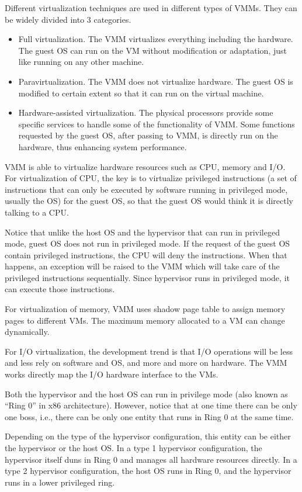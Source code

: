 Different virtualization techniques are used in different types of VMMs. They can be widely divided into 3 categories.
\begin{itemize}
	\item Full virtualization. The VMM virtualizes everything including the hardware. The guest OS can run on the VM without modification or adaptation, just like running on any other machine.
	\item Paravirtualization. The VMM does not virtualize hardware. The guest OS is modified to certain extent so that it can run on the virtual machine.
	\item Hardware-assisted virtualization. The physical processors provide some specific services to handle some of the functionality of VMM. Some functions requested by the guest OS, after passing to VMM, is directly run on the hardware, thus enhancing system performance.
\end{itemize}

VMM is able to virtualize hardware resources such as CPU, memory and I/O. For virtualization of CPU, the key is to virtualize privileged instructions (a set of instructions that can only be executed by software running in privileged mode, usually the OS) for the guest OS, so that the guest OS would think it is directly talking to a CPU. 

Notice that unlike the host OS and the hypervisor that can run in privileged mode, guest OS does not run in privileged mode. If the request of the guest OS contain privileged instructions, the CPU will deny the instructions. When that happens, an exception will be raised to the VMM which will take care of the privileged instructions sequentially. Since hypervisor runs in privileged mode, it can execute those instructions.

For virtualization of memory, VMM uses shadow page table to assign memory pages to different VMs. The maximum memory allocated to a VM can change dynamically.

For I/O virtualization, the development trend is that I/O operations will be less and less rely on software and OS, and more and more on hardware. The VMM works directly map the I/O hardware interface to the VMs.

\begin{shortbox}
	Both the hypervisor and the host OS can run in privilege mode (also known as ``Ring 0'' in x86 architecture). However, notice that at one time there can be only one boss, i.e., there can be only one entity that runs in Ring 0 at the same time.
	
	Depending on the type of the hypervisor configuration, this entity can be either the hypervisor or the host OS. In a type 1 hypervisor configuration, the hypervisor itself duns in Ring 0 and manages all hardware resources directly. In a type 2 hypervisor configuration, the host OS runs in Ring 0, and the hypervisor runs in a lower privileged ring.
\end{shortbox}

